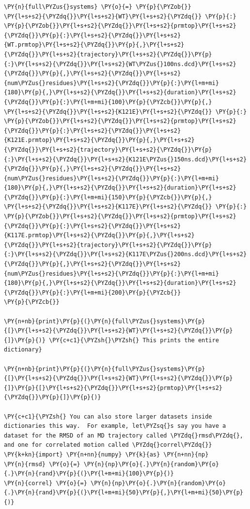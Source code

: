 \begin{tcolorbox}[breakable, size=fbox, boxrule=1pt, pad at break*=1mm,colback=cellbackground, colframe=cellborder]
\begin{Verbatim}[commandchars=\\\{\}]
\PY{n}{full\PYZus{}systems} \PY{o}{=} \PY{p}{\PYZob{}}
\PY{l+s+s2}{\PYZdq{}}\PY{l+s+s2}{WT}\PY{l+s+s2}{\PYZdq{}} \PY{p}{:} \PY{p}{\PYZob{}}\PY{l+s+s2}{\PYZdq{}}\PY{l+s+s2}{prmtop}\PY{l+s+s2}{\PYZdq{}}\PY{p}{:}\PY{l+s+s2}{\PYZdq{}}\PY{l+s+s2}{WT.prmtop}\PY{l+s+s2}{\PYZdq{}}\PY{p}{,}\PY{l+s+s2}{\PYZdq{}}\PY{l+s+s2}{trajectory}\PY{l+s+s2}{\PYZdq{}}\PY{p}{:}\PY{l+s+s2}{\PYZdq{}}\PY{l+s+s2}{WT\PYZus{}100ns.dcd}\PY{l+s+s2}{\PYZdq{}}\PY{p}{,}\PY{l+s+s2}{\PYZdq{}}\PY{l+s+s2}{num\PYZus{}residues}\PY{l+s+s2}{\PYZdq{}}\PY{p}{:}\PY{l+m+mi}{180}\PY{p}{,}\PY{l+s+s2}{\PYZdq{}}\PY{l+s+s2}{duration}\PY{l+s+s2}{\PYZdq{}}\PY{p}{:}\PY{l+m+mi}{100}\PY{p}{\PYZcb{}}\PY{p}{,}
\PY{l+s+s2}{\PYZdq{}}\PY{l+s+s2}{K121E}\PY{l+s+s2}{\PYZdq{}} \PY{p}{:} \PY{p}{\PYZob{}}\PY{l+s+s2}{\PYZdq{}}\PY{l+s+s2}{prmtop}\PY{l+s+s2}{\PYZdq{}}\PY{p}{:}\PY{l+s+s2}{\PYZdq{}}\PY{l+s+s2}{K121E.prmtop}\PY{l+s+s2}{\PYZdq{}}\PY{p}{,}\PY{l+s+s2}{\PYZdq{}}\PY{l+s+s2}{trajectory}\PY{l+s+s2}{\PYZdq{}}\PY{p}{:}\PY{l+s+s2}{\PYZdq{}}\PY{l+s+s2}{K121E\PYZus{}150ns.dcd}\PY{l+s+s2}{\PYZdq{}}\PY{p}{,}\PY{l+s+s2}{\PYZdq{}}\PY{l+s+s2}{num\PYZus{}residues}\PY{l+s+s2}{\PYZdq{}}\PY{p}{:}\PY{l+m+mi}{180}\PY{p}{,}\PY{l+s+s2}{\PYZdq{}}\PY{l+s+s2}{duration}\PY{l+s+s2}{\PYZdq{}}\PY{p}{:}\PY{l+m+mi}{150}\PY{p}{\PYZcb{}}\PY{p}{,}
\PY{l+s+s2}{\PYZdq{}}\PY{l+s+s2}{K117E}\PY{l+s+s2}{\PYZdq{}} \PY{p}{:} \PY{p}{\PYZob{}}\PY{l+s+s2}{\PYZdq{}}\PY{l+s+s2}{prmtop}\PY{l+s+s2}{\PYZdq{}}\PY{p}{:}\PY{l+s+s2}{\PYZdq{}}\PY{l+s+s2}{K117E.prmtop}\PY{l+s+s2}{\PYZdq{}}\PY{p}{,}\PY{l+s+s2}{\PYZdq{}}\PY{l+s+s2}{trajectory}\PY{l+s+s2}{\PYZdq{}}\PY{p}{:}\PY{l+s+s2}{\PYZdq{}}\PY{l+s+s2}{K117E\PYZus{}200ns.dcd}\PY{l+s+s2}{\PYZdq{}}\PY{p}{,}\PY{l+s+s2}{\PYZdq{}}\PY{l+s+s2}{num\PYZus{}residues}\PY{l+s+s2}{\PYZdq{}}\PY{p}{:}\PY{l+m+mi}{180}\PY{p}{,}\PY{l+s+s2}{\PYZdq{}}\PY{l+s+s2}{duration}\PY{l+s+s2}{\PYZdq{}}\PY{p}{:}\PY{l+m+mi}{200}\PY{p}{\PYZcb{}} 
\PY{p}{\PYZcb{}}

\PY{n+nb}{print}\PY{p}{(}\PY{n}{full\PYZus{}systems}\PY{p}{[}\PY{l+s+s2}{\PYZdq{}}\PY{l+s+s2}{WT}\PY{l+s+s2}{\PYZdq{}}\PY{p}{]}\PY{p}{)} \PY{c+c1}{\PYZsh{}\PYZsh{} This prints the entire dictionary}

\PY{n+nb}{print}\PY{p}{(}\PY{n}{full\PYZus{}systems}\PY{p}{[}\PY{l+s+s2}{\PYZdq{}}\PY{l+s+s2}{WT}\PY{l+s+s2}{\PYZdq{}}\PY{p}{]}\PY{p}{[}\PY{l+s+s2}{\PYZdq{}}\PY{l+s+s2}{prmtop}\PY{l+s+s2}{\PYZdq{}}\PY{p}{]}\PY{p}{)}

\PY{c+c1}{\PYZsh{} You can also store larger datasets inside dictionaries this way.  For example, let\PYZsq{}s say you have a dataset for the RMSD of an MD trajectory called \PYZdq{}rmsd\PYZdq{}, and one for correlated motion called \PYZdq{}correl\PYZdq{}}
\PY{k+kn}{import} \PY{n+nn}{numpy} \PY{k}{as} \PY{n+nn}{np}
\PY{n}{rmsd} \PY{o}{=} \PY{n}{np}\PY{o}{.}\PY{n}{random}\PY{o}{.}\PY{n}{rand}\PY{p}{(}\PY{l+m+mi}{100}\PY{p}{)}
\PY{n}{correl} \PY{o}{=} \PY{n}{np}\PY{o}{.}\PY{n}{random}\PY{o}{.}\PY{n}{rand}\PY{p}{(}\PY{l+m+mi}{50}\PY{p}{,}\PY{l+m+mi}{50}\PY{p}{)}


\end{Verbatim}
\end{tcolorbox}

